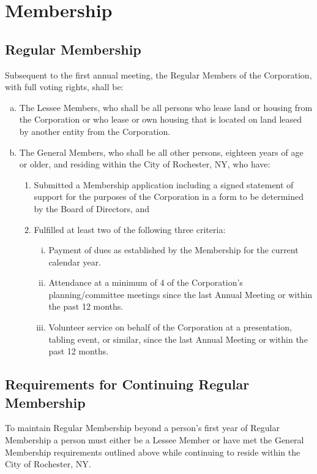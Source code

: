 \section{Membership}
\label{sec:membership}

\subsection{Regular Membership}
Subsequent to the first annual meeting, the Regular Members of the
Corporation, with full voting rights, shall be:
\begin{enumerate}[a.]
\item The Lessee Members, who shall be all persons who lease land or
  housing from the Corporation or who lease or own housing that is
  located on land leased by another entity from the Corporation.
\item The General Members, who shall be all other persons, eighteen
  years of age or older, and residing within the City of Rochester,
  NY, who have:
  \begin{enumerate}[(1)]
  \item Submitted a Membership application including a signed
    statement of support for the purposes of the Corporation in a form
    to be determined by the Board of Directors, and
  \item Fulfilled at least two of the following three criteria:
    \begin{enumerate}[i.]
      \item Payment of dues as established by the Membership for the
        current calendar year.
      \item Attendance at a minimum of 4 of the Corporation's
        planning/committee meetings since the last Annual Meeting or
        within the past 12 months.
      \item Volunteer service on behalf of the Corporation at a
        presentation, tabling event, or similar, since the last Annual
        Meeting or within the past 12 months.
    \end{enumerate}
  \end{enumerate}
\end{enumerate}

\subsection{Requirements for Continuing Regular Membership}
To maintain Regular Membership beyond a person’s first year of Regular
Membership a person must either be a Lessee Member or have met the
General Membership requirements outlined above while continuing to
reside within the City of Rochester, NY.

